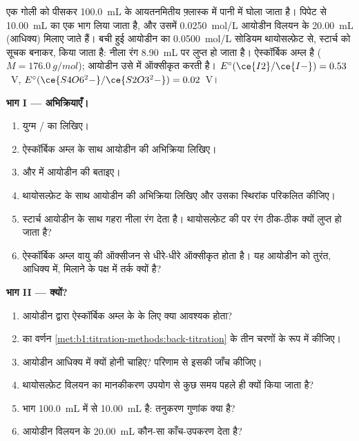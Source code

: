 \begin{problem}
\label{pb:b1:titration-methods:1}
एक गोली को पीसकर \qty{100.0}{mL} के आयतनमितीय फ़्लास्क में पानी में
घोला जाता है। पिपेट से \qty{10.00}{mL} का एक भाग लिया जाता है, और
उसमें \qty{0.0250}{mol/L} आयोडीन विलयन के \qty{20.00}{mL} (आधिक्य) मिलाए जाते हैं।
बची हुई आयोडीन का \qty{0.0500}{mol/L} सोडियम थायोसल्फ़ेट से, स्टार्च को
सूचक बनाकर,  किया जाता है: नीला रंग \qty{8.90}{mL} पर लुप्त हो जाता है।
ऐस्कॉर्बिक अम्ल  है ($M = \qty{176.0}{g/mol}$); आयोडीन उसे
 में ऑक्सीकृत करती है। $E^\circ(\ce{I2}/\ce{I-}) = 0.53$~V,
$E^\circ(\ce{S4O6^2-}/\ce{S2O3^2-}) = 0.02$~V।

\medskip
\noindent\textbf{भाग I --- अभिक्रियाएँ।}
\begin{enumerate}
  \item युग्म / का  लिखिए।
  \item ऐस्कॉर्बिक अम्ल के साथ आयोडीन की अभिक्रिया लिखिए।
  \item {} और  में आयोडीन की  बताइए।
  \item थायोसल्फ़ेट के साथ आयोडीन की अभिक्रिया लिखिए और उसका
        स्थिरांक परिकलित कीजिए।
  \item स्टार्च आयोडीन के साथ गहरा नीला रंग देता है। थायोसल्फ़ेट  की  पर
        रंग ठीक-ठीक क्यों लुप्त हो जाता है?
  \item ऐस्कॉर्बिक अम्ल वायु की ऑक्सीजन से धीरे-धीरे ऑक्सीकृत होता है। यह आयोडीन को
        तुरंत, आधिक्य में, मिलाने के पक्ष में तर्क क्यों है?
\end{enumerate}

\medskip
\noindent\textbf{भाग II ---  क्यों?}
\begin{enumerate}[resume]
  \item आयोडीन द्वारा ऐस्कॉर्बिक अम्ल के  के लिए क्या आवश्यक होता?
  \item {} का वर्णन \cref{met:b1:titration-methods:back-titration} के
        तीन चरणों के रूप में कीजिए।
  \item आयोडीन आधिक्य में क्यों होनी चाहिए? परिणाम से इसकी जाँच कीजिए।
  \item थायोसल्फ़ेट विलयन का मानकीकरण उपयोग से कुछ समय पहले ही क्यों किया जाता है?
  \item भाग \qty{100.0}{mL} में से \qty{10.00}{mL} है: तनुकरण
        गुणांक क्या है?
  \item आयोडीन विलयन के \qty{20.00}{mL} कौन-सा काँच-उपकरण देता है?
\end{enumerate}


\end{problem}
